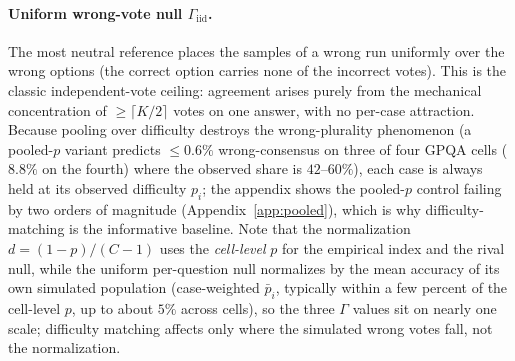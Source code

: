 \documentclass[a4paper,fleqn]{cas-sc}
\newcommand{\agreementIndex}{\Gamma}
\begin{document}
\paragraph{Uniform wrong-vote null $\agreementIndex_{\mathrm{iid}}$.}
The most neutral reference places the samples of a wrong run
uniformly over the wrong options (the correct option carries none of the
incorrect votes). This is the classic independent-vote ceiling: agreement
arises purely from the mechanical concentration of $\ge\lceil K/2\rceil$
votes on one answer, with no per-case attraction. Because pooling over
difficulty destroys the wrong-plurality phenomenon (a pooled-$p$ variant
predicts $\le0.6\%$ wrong-consensus on three of four GPQA cells
($8.8\%$ on the fourth) where the observed
share is $42$--$60\%$), each case is always held at its observed
difficulty $p_i$; the appendix shows the pooled-$p$ control failing by
two orders of magnitude (Appendix~\ref{app:pooled}), which is why difficulty-matching is the
informative baseline. Note that the normalization $d=(1-p)/(C-1)$ uses
the \emph{cell-level} $p$ for the empirical index and the rival null,
while the uniform per-question null normalizes by the mean accuracy of
its own simulated population (case-weighted $\bar p_i$, typically within
a few percent of the cell-level $p$, up to about $5\%$ across cells), so
the three $\agreementIndex$ values sit on
nearly one scale; difficulty matching
affects only where the simulated wrong votes fall, not the normalization.
\end{document}
